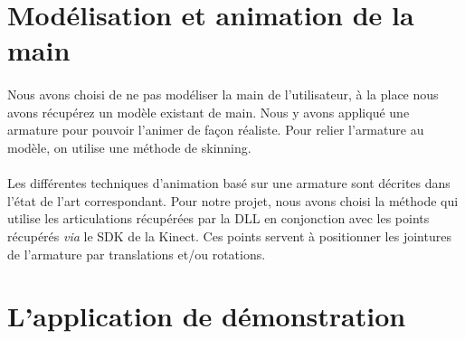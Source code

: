 \section{Modélisation et animation de la main}
\paragraph{}
Nous avons choisi de ne pas modéliser la main de l'utilisateur, à la place nous avons récupérez un modèle existant de main.
Nous y avons appliqué une armature pour pouvoir l'animer de façon réaliste. Pour relier l'armature au modèle, on utilise une méthode de skinning.

\paragraph{}
Les différentes techniques d'animation basé sur une armature sont décrites dans l'état de l'art correspondant. Pour notre projet, nous avons choisi la méthode qui utilise les articulations récupérées par la DLL en conjonction avec les points récupérés \textit{via} le SDK de la Kinect. Ces points servent à positionner les jointures de l'armature par translations et/ou rotations.

\section{L'application de démonstration}